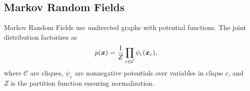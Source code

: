 \subsection{Markov Random Fields}

Markov Random Fields use undirected graphs with potential functions. The joint distribution factorizes as
\begin{equation}
p(\boldsymbol{x}) = \frac{1}{Z} \prod_{c \in \mathcal{C}} \psi_c(\boldsymbol{x}_c),
\end{equation}
where $\mathcal{C}$ are cliques, $\psi_c$ are nonnegative potentials over variables in clique $c$, and $Z$ is the partition function ensuring normalization.






